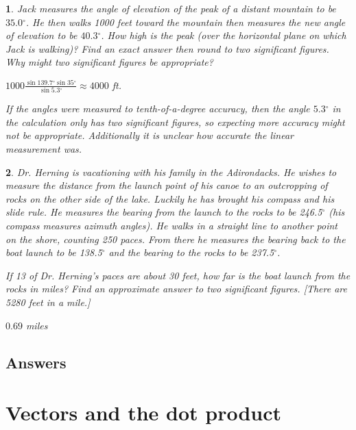 \documentclass{amsbook}
\newtheorem{exc}{}
\newenvironment{ex}{\begin{exc}\normalfont}{\end{exc}}
\numberwithin{section}{chapter}
\numberwithin{equation}{chapter}
\newcommand{\dg}{{^\circ}}
\begin{document}
\begin{ex}
	Jack measures the angle of elevation of the peak of a distant mountain to be $35.0\dg$. He then walks 1000 feet toward the mountain then measures the new angle of elevation to be $40.3\dg$. How high is the peak (over the horizontal plane on which Jack is walking)? Find an exact answer then round to two significant figures. Why might two significant figures be appropriate?
	\begin{sol}
		$1000\frac{\sin139.7\dg \sin 35\dg}{\sin 5.3\dg} \approx 4000$ ft.
		
		If the angles were measured to tenth-of-a-degree accuracy, then the angle $5.3\dg$ in the calculation only has two significant figures, so expecting more accuracy might not be appropriate. Additionally it is unclear how accurate the linear measurement was.
	\end{sol}
\end{ex}

\begin{ex}
	Dr. Herning is vacationing with his family in the Adirondacks. He wishes to measure the distance from the launch point of his canoe to an outcropping of rocks on the other side of the lake. Luckily he has brought his compass and his slide rule. He measures the bearing from the launch to the rocks to be 246.5$^\circ$ (his compass measures azimuth angles). He walks in a straight line to another point on the shore, counting 250 paces. From there he measures the bearing back to the boat launch to be 138.5$^\circ$ and the bearing to the rocks to be 237.5$^\circ$.
	
	\smallskip
	If 13 of Dr. Herning's paces are about 30 feet, how far is the boat launch from the rocks in miles? Find an approximate answer to two significant figures. [There are 5280 feet in a mile.]
	\begin{sol}
		$0.69$ miles
		\end{sol}
\end{ex}


\subsection*{Answers \nopunct} \hfill
\begin{multicols}{2}
	
\end{multicols}


\newpage
\section{Vectors and the dot product}
\end{document}
